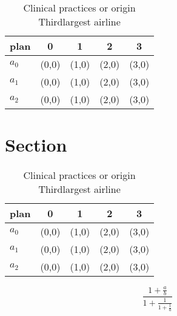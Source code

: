 \documentclass[a4paper]{article}
\begin{document}
\begin{table}
\begin{adjustbox}{width=0.6\columnwidth}
\begin{tabular}{|l|l|l|l|l|}
\hline
\textbf{plan} & \multicolumn{1}{c|}{\textbf{0}} & \multicolumn{1}{c|}{\textbf{1}} & \multicolumn{1}{c|}{\textbf{2}} & \multicolumn{1}{c|}{\textbf{3}} \\ \hline
\textbf{$a_0$}  & (0,0) & (1,0) & (2,0) & (3,0) \\ \hline
\textbf{$a_1$}  & (0,0) & (1,0) & (2,0) & (3,0) \\ \hline
\textbf{$a_2$}  & (0,0) & (1,0) & (2,0) & (3,0) \\ \hline
\end{tabular}
\end{adjustbox}
\caption{Clinical practices or origin Thirdlargest airline
}
\end{table}

\section{Section}

\begin{table}
\begin{adjustbox}{width=0.6\columnwidth}
\begin{tabular}{|l|l|l|l|l|}
\hline
\textbf{plan} & \multicolumn{1}{c|}{\textbf{0}} & \multicolumn{1}{c|}{\textbf{1}} & \multicolumn{1}{c|}{\textbf{2}} & \multicolumn{1}{c|}{\textbf{3}} \\ \hline
\textbf{$a_0$}  & (0,0) & (1,0) & (2,0) & (3,0) \\ \hline
\textbf{$a_1$}  & (0,0) & (1,0) & (2,0) & (3,0) \\ \hline
\textbf{$a_2$}  & (0,0) & (1,0) & (2,0) & (3,0) \\ \hline
\end{tabular}
\end{adjustbox}
\caption{Clinical practices or origin Thirdlargest airline
}
\end{table}

\[ \frac{1+\frac{a}{b}}{1+\frac{1}{1+\frac{1}{a}}} \]
\end{document}
